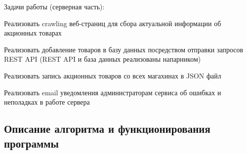 Задачи работы (серверная часть):

\smallskip
\begin{my_enumerate}
    \item Реализовать crawling веб-страниц для сбора актуальной информации об акционных товарах
    \item Реализовать добавление товаров в базу данных посредством отправки запросов REST API (REST API и база данных реализованы напарником)
    \item Реализовать запись акционных товаров со всех магахинах в JSON файл
    \item Реализовать email уведомления администраторам сервиса об ошибках и неполадках в работе сервера
\end{my_enumerate}


\subsection{Описание алгоритма и функционирования программы}

